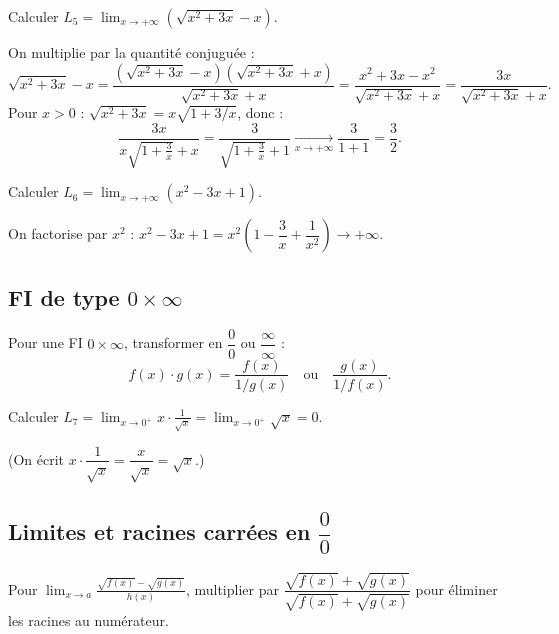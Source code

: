 \begin{exemple}
	Calculer $\displaystyle L_5=\lim_{x\to+\infty}\left(\sqrt{x^2+3x}-x\right)$.
	
	On multiplie par la quantité conjuguée :
	\[
	\sqrt{x^2+3x}-x
	= \frac{(\sqrt{x^2+3x}-x)(\sqrt{x^2+3x}+x)}{\sqrt{x^2+3x}+x}
	= \frac{x^2+3x-x^2}{\sqrt{x^2+3x}+x}
	= \frac{3x}{\sqrt{x^2+3x}+x}.
	\]
	Pour $x>0$ : $\sqrt{x^2+3x}=x\sqrt{1+3/x}$, donc :
	\[
	\frac{3x}{x\sqrt{1+\frac{3}{x}}+x}
	= \frac{3}{\sqrt{1+\frac{3}{x}}+1}
	\xrightarrow[x\to+\infty]{} \frac{3}{1+1} = \frac{3}{2}.
	\]
\end{exemple}

\begin{exemple}
	Calculer $\displaystyle L_6=\lim_{x\to+\infty}(x^2-3x+1)$.
	
	On factorise par $x^2$ :
	$x^2-3x+1 = x^2\!\left(1-\dfrac{3}{x}+\dfrac{1}{x^2}\right)\to+\infty$.
\end{exemple}

\subsection{FI de type \texorpdfstring{$0\times\infty$}{0 x inf}}

\begin{methode}
	Pour une FI $0\times\infty$, transformer en $\dfrac{0}{0}$ ou
	$\dfrac{\infty}{\infty}$ :
	\[
	f(x)\cdot g(x) = \frac{f(x)}{1/g(x)} \quad \text{ou} \quad
	\frac{g(x)}{1/f(x)}.
	\]
\end{methode}

\begin{exemple}
	Calculer $\displaystyle L_7=\lim_{x\to 0^+} x\cdot\frac{1}{\sqrt{x}}
	= \lim_{x\to 0^+}\sqrt{x} = 0$.
	
	(On écrit $x\cdot\dfrac{1}{\sqrt{x}}=\dfrac{x}{\sqrt{x}}=\sqrt{x}$.)
\end{exemple}

\subsection{Limites et racines carrées en \texorpdfstring{$\dfrac{0}{0}$}{0/0}}

\begin{methode}
	Pour $\displaystyle\lim_{x\to a}\frac{\sqrt{f(x)}-\sqrt{g(x)}}{h(x)}$,
	multiplier par $\dfrac{\sqrt{f(x)}+\sqrt{g(x)}}{\sqrt{f(x)}+\sqrt{g(x)}}$
	pour éliminer les racines au numérateur.
\end{methode}

